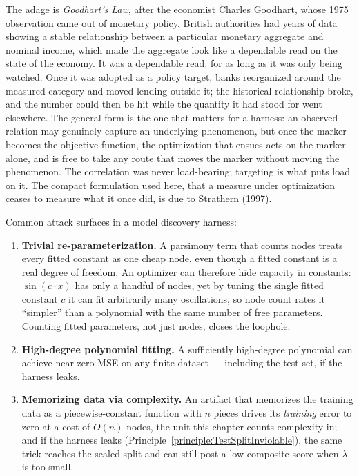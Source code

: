 The adage is \emph{Goodhart's Law}, after the economist Charles Goodhart, whose 1975 observation came out of monetary policy.
British authorities had years of data showing a stable relationship between a particular monetary aggregate and nominal income, which made the aggregate look like a dependable read on the state of the economy.
It was a dependable read, for as long as it was only being watched.
Once it was adopted as a policy target, banks reorganized around the measured category and moved lending outside it; the historical relationship broke, and the number could then be hit while the quantity it had stood for went elsewhere.
The general form is the one that matters for a harness: an observed relation may genuinely capture an underlying phenomenon, but once the marker becomes the objective function, the optimization that ensues acts on the marker alone, and is free to take any route that moves the marker without moving the phenomenon.
The correlation was never load-bearing; targeting is what puts load on it.
The compact formulation used here, that a measure under optimization ceases to measure what it once did, is due to Strathern (1997).

Common attack surfaces in a model discovery harness:
\begin{enumerate}
\item \textbf{Trivial re-parameterization.} A parsimony term that counts nodes treats every fitted constant as one cheap node, even though a fitted constant is a real degree of freedom.
An optimizer can therefore hide capacity in constants: $\sin(c \cdot x)$ has only a handful of nodes, yet by tuning the single fitted constant $c$ it can fit arbitrarily many oscillations, so node count rates it ``simpler'' than a polynomial with the same number of free parameters.
Counting fitted parameters, not just nodes, closes the loophole.
\item \textbf{High-degree polynomial fitting.} A sufficiently high-degree polynomial can achieve near-zero MSE on any finite dataset — including the test set, if the harness leaks.
\item \textbf{Memorizing data via complexity.} An artifact that memorizes the training data as a piecewise-constant function with $n$ pieces drives its \emph{training} error to zero at a cost of $O(n)$ nodes, the unit this chapter counts complexity in; and if the harness leaks (Principle~\ref{principle:TestSplitInviolable}), the same trick reaches the sealed split and can still post a low composite score when $\lambda$ is too small.
\end{enumerate}

